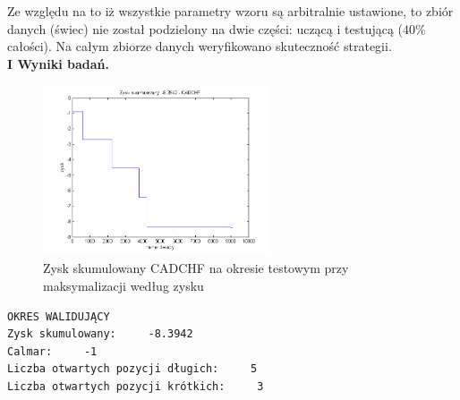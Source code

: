 Ze względu na to iż wszystkie parametry wzoru są arbitralnie ustawione, to zbiór danych (świec) nie został podzielony na dwie części: uczącą i testującą ($40\%$ całości). Na całym zbiorze danych weryfikowano skuteczność strategii. \\


\newpage
\noindent \textbf{I Wyniki badań.}\\
\begin{figure}[h!]
\centering
\includegraphics[width = 0.6\textwidth]{MI_CADCHF_S4LS.png}
\caption{Zysk skumulowany CADCHF na okresie testowym przy maksymalizacji według zysku}
\end{figure}
\FloatBarrier
\begin{verbatim}
OKRES WALIDUJĄCY
Zysk skumulowany:     -8.3942
Calmar:     -1
Liczba otwartych pozycji długich:     5
Liczba otwartych pozycji krótkich:     3
\end{verbatim}
%

